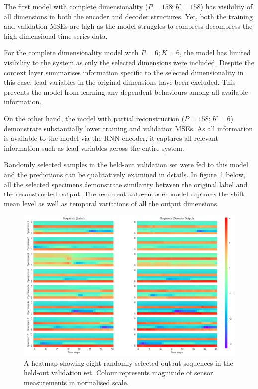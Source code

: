 \documentclass[runningheads]{llncs}
\begin{document}
The first model with complete dimensionality (\(P=158; K=158\)) has visibility of all dimensions in both the encoder and decoder structures. Yet, both the training and validation MSEs are high as the model struggles to compress-decompress the high dimensional time series data.

For the complete dimensionality model with \(P=6; K=6\), the model has limited visibility to the system as only the selected dimensions were included. Despite the context layer summarises information specific to the selected dimensionality in this case, lead variables in the original dimensions have been excluded. This prevents the model from learning any dependent behaviours among all available information.

On the other hand, the model with partial reconstruction (\(P=158; K=6\)) demonstrate substantially lower training and validation MSEs. As all information is available to the model via the RNN encoder, it captures all relevant information such as lead variables across the entire system. 

Randomly selected samples in the held-out validation set were fed to this model and the predictions can be qualitatively examined in details. In figure~\ref{fig:heatmaps} below, all the selected specimens demonstrate similarity between the original label and the reconstructed output. The recurrent auto-encoder model captures the shift mean level as well as temporal variations of all the output dimensions. 

\begin{figure}[H]
	\centering
	\includegraphics[width=.8\textwidth]{heatmaps.PNG}
	\caption{A heatmap showing eight randomly selected output sequences in the held-out validation set. Colour represents magnitude of sensor measurements in normalised scale.}
	\label{fig:heatmaps}
\end{figure}
\end{document}
